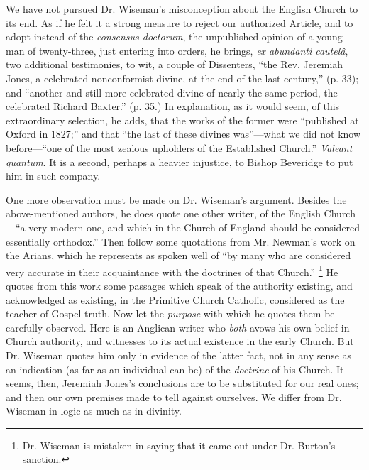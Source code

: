 We have not
pursued Dr. Wiseman's misconception about the English Church to its
end. As if he felt it a strong measure to reject our authorized Article,
and to adopt instead of the \emph{consensus doctorum}, the unpublished
opinion of a young man of twenty-three, just entering into orders, he
brings, \emph{ex abundanti cautelâ}, two additional testimonies, to
wit, a couple of Dissenters, ``the Rev. Jeremiah Jones, a celebrated
nonconformist divine, at the end of the last century,'' (p. 33); and ``another and still more celebrated divine of nearly the same period,
the celebrated Richard Baxter.'' (p. 35.) In explanation, as it would
seem, of this extraordinary selection, he adds, that the works of the
former were ``published at Oxford in 1827;'' and that ``the last of
these divines was''—what we did not know before—``one of the most
zealous upholders of the Established Church.'' \emph{Valeant quantum}.
It is a second, perhaps a heavier injustice, to Bishop Beveridge to put
him in such company.

One more
observation must be made on Dr. Wiseman's argument. Besides the
above-mentioned authors, he does quote one other writer, of the English
Church—``a very modern one, and which in the Church of England should
be considered essentially orthodox.'' Then follow some quotations from
Mr. Newman's work on the Arians, which he represents as spoken well of ``by many who are considered very accurate in their acquaintance with
the doctrines of that Church.'' \footnote{Dr. Wiseman
is mistaken in saying that it came out under Dr. Burton's sanction.}
He quotes from this work some passages which speak of the authority
existing, and acknowledged as existing, in the Primitive Church
Catholic, considered as the teacher of Gospel truth. Now let the \emph{purpose}
with which he quotes them be carefully observed. Here is an Anglican
writer who \emph{both} avows his own belief in Church authority, and
witnesses to its actual existence in the early Church. But Dr. Wiseman
quotes him only in evidence of the latter fact, not in any sense as an
indication (as far as an individual can be) of the \emph{doctrine} of
his Church. It seems, then, Jeremiah Jones's conclusions are to be
substituted for our real ones; and then our own premises made to
tell against ourselves. We differ from Dr. Wiseman in logic as much as
in divinity.

